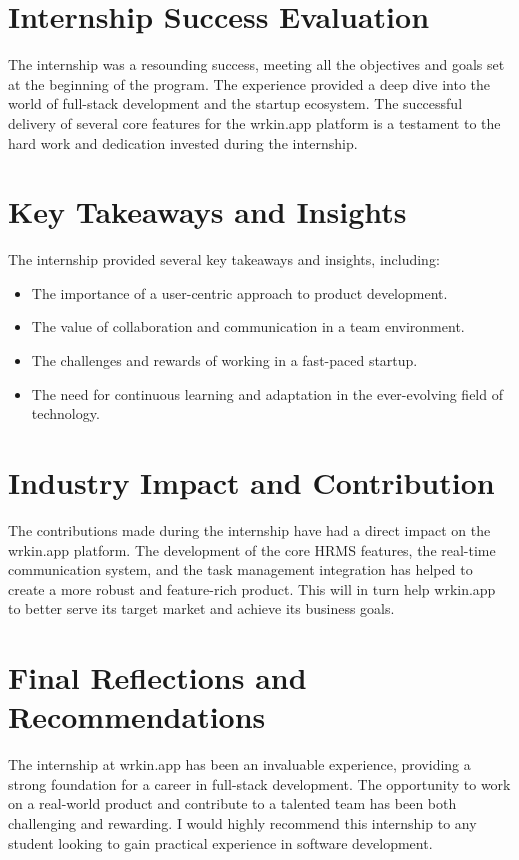 \section{Internship Success Evaluation}
The internship was a resounding success, meeting all the objectives and goals set at the beginning of the program. The experience provided a deep dive into the world of full-stack development and the startup ecosystem. The successful delivery of several core features for the wrkin.app platform is a testament to the hard work and dedication invested during the internship.

\section{Key Takeaways and Insights}
The internship provided several key takeaways and insights, including:
\begin{itemize}
    \item The importance of a user-centric approach to product development.
    \item The value of collaboration and communication in a team environment.
    \item The challenges and rewards of working in a fast-paced startup.
    \item The need for continuous learning and adaptation in the ever-evolving field of technology.
\end{itemize}

\section{Industry Impact and Contribution}
The contributions made during the internship have had a direct impact on the wrkin.app platform. The development of the core HRMS features, the real-time communication system, and the task management integration has helped to create a more robust and feature-rich product. This will in turn help wrkin.app to better serve its target market and achieve its business goals.

\section{Final Reflections and Recommendations}
The internship at wrkin.app has been an invaluable experience, providing a strong foundation for a career in full-stack development. The opportunity to work on a real-world product and contribute to a talented team has been both challenging and rewarding. I would highly recommend this internship to any student looking to gain practical experience in software development.